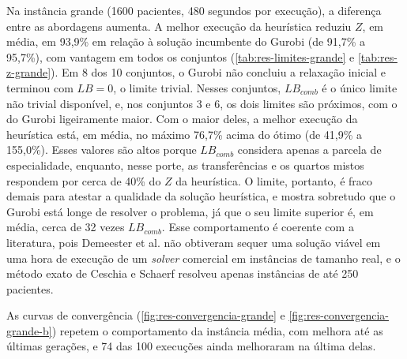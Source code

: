 Na instância grande (1600 pacientes, 480 segundos por execução), a diferença entre as abordagens aumenta. A melhor execução da heurística reduziu $Z$, em média, em 93,9\% em relação à solução incumbente do Gurobi (de 91,7\% a 95,7\%), com vantagem em todos os conjuntos (\autoref{tab:res-limites-grande} e \autoref{tab:res-z-grande}). Em 8 dos 10 conjuntos, o Gurobi não concluiu a relaxação inicial e terminou com $LB = 0$, o limite trivial. Nesses conjuntos, $LB_{comb}$ é o único limite não trivial disponível, e, nos conjuntos 3 e 6, os dois limites são próximos, com o do Gurobi ligeiramente maior. Com o maior deles, a melhor execução da heurística está, em média, no máximo 76,7\% acima do ótimo (de 41,9\% a 155,0\%). Esses valores são altos porque $LB_{comb}$ considera apenas a parcela de especialidade, enquanto, nesse porte, as transferências e os quartos mistos respondem por cerca de 40\% do $Z$ da heurística. O limite, portanto, é fraco demais para atestar a qualidade da solução heurística, e mostra sobretudo que o Gurobi está longe de resolver o problema, já que o seu limite superior é, em média, cerca de 32 vezes $LB_{comb}$. Esse comportamento é coerente com a literatura, pois Demeester et al. \cite{demeester2010hybrid} não obtiveram sequer uma solução viável em uma hora de execução de um \textit{solver} comercial em instâncias de tamanho real, e o método exato de Ceschia e Schaerf \cite{ceschia2012modeling} resolveu apenas instâncias de até 250 pacientes.

As curvas de convergência (\autoref{fig:res-convergencia-grande} e \autoref{fig:res-convergencia-grande-b}) repetem o comportamento da instância média, com melhora até as últimas gerações, e 74 das 100 execuções ainda melhoraram na última delas.

